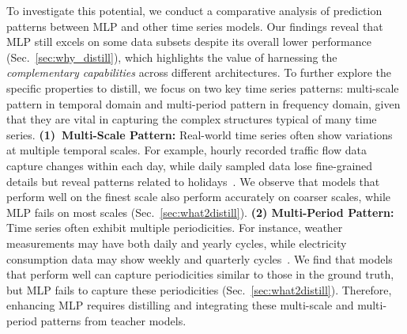 To investigate this potential, we conduct a comparative analysis of prediction patterns between MLP and other time series models.  Our findings reveal that MLP still excels on some data subsets despite its overall lower performance (Sec.~\ref{sec:why_distill}), which highlights the value of harnessing the \textit{complementary capabilities} across different architectures. 
To further explore the specific properties to distill, we focus on two key time series patterns: multi-scale pattern in temporal domain and multi-period pattern in frequency domain, given that they are vital in capturing the complex structures typical of many time series.
\textbf{(1)~Multi-Scale Pattern:} Real-world 
 time series often show variations at multiple temporal scales. For example, hourly recorded traffic flow data capture changes within each day, while daily sampled data lose fine-grained details but reveal patterns related to holidays~\cite{timemixer}. We observe that models that perform well on the finest scale also perform accurately on coarser scales, while MLP fails on most scales (Sec.~\ref{sec:what2distill}). 
\textbf{(2) Multi-Period Pattern:} Time series often exhibit multiple periodicities. For instance, weather measurements may have both daily and yearly cycles, while electricity consumption data may show weekly and quarterly cycles~\cite{timesnet}. We find that models that perform well can capture periodicities similar to those in the ground truth, but MLP fails to capture these periodicities (Sec.~\ref{sec:what2distill}).
Therefore, enhancing MLP requires distilling and integrating these multi-scale and multi-period patterns from teacher models. 


